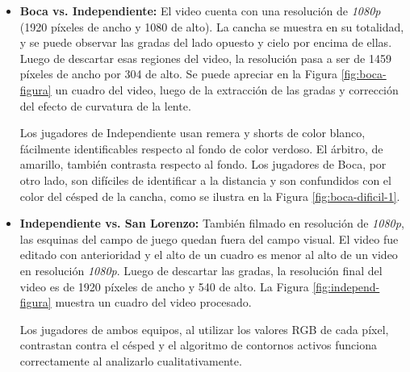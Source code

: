 \begin{itemize}

  \item \textbf{Boca vs. Independiente:} El video cuenta con una resolución de
    \textit{1080p} (1920 píxeles de ancho y 1080 de alto). La cancha se muestra
    en su totalidad, y se puede observar las gradas del lado
    opuesto y cielo por encima de ellas. Luego de descartar esas regiones del
    video, la resolución pasa a ser de 1459 píxeles de ancho por 304 de alto.
    Se puede apreciar en la Figura \ref{fig:boca-figura} un cuadro del video, luego
    de la extracción de las gradas y corrección del efecto de curvatura de la
    lente.

    Los jugadores de Independiente usan remera y shorts de color blanco,
    fácilmente identificables respecto al fondo de color verdoso. El árbitro, de
    amarillo, también contrasta respecto al fondo. Los jugadores de Boca, por
    otro lado, son difíciles de identificar a la distancia y son confundidos con
    el color del césped de la cancha, como se ilustra en la Figura \ref{fig:boca-dificil-1}.

  \item \textbf{Independiente vs. San Lorenzo:} También filmado en resolución de
      \textit{1080p}, las esquinas del campo de juego quedan fuera del campo
      visual. El video fue editado con anterioridad y el alto de un cuadro es
      menor al alto de un video en resolución \textit{1080p}. Luego de descartar
      las gradas, la resolución final del video es de 1920 píxeles de ancho y
      540 de alto. La Figura \ref{fig:independ-figura} muestra un cuadro del
      video procesado.

    Los jugadores de ambos equipos, al utilizar los valores RGB de cada píxel,
    contrastan contra el césped y el algoritmo de contornos activos funciona
    correctamente al analizarlo cualitativamente.

\end{itemize}

